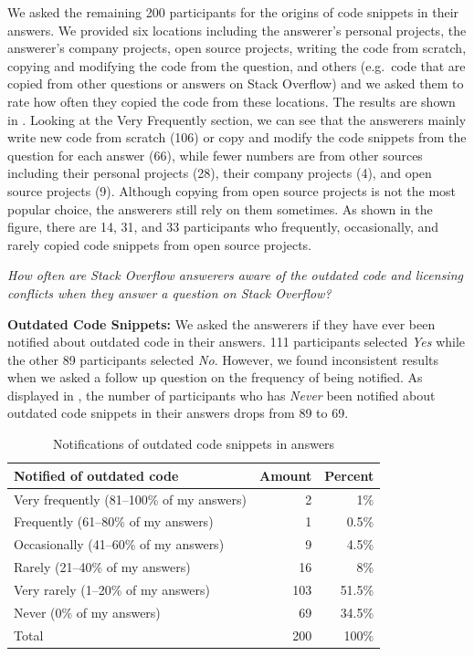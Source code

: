 \documentclass[10pt,journal,compsoc]{IEEEtran}
\begin{document}
We asked the remaining 200 participants for the origins of code snippets in
their answers. We provided six locations including the answerer's personal
projects, the answerer's company projects, open source projects, writing the
code from scratch, copying and modifying the code from the question, and others
(e.g.\ code that are copied from other questions or answers on Stack Overflow)
and we asked them to rate how often they copied the code from these locations. The
results are shown in . Looking at the Very
Frequently section, we can see that the answerers mainly write new code from
scratch (106) or copy and modify the code snippets from the question for each answer (66),
while fewer numbers are from other sources including their personal projects
(28), their company projects (4), and open source projects (9). Although
copying from open source projects is not the most popular choice, the answerers
still rely on them sometimes. As shown in the figure, there are 14, 31, and 33
participants who frequently, occasionally, and rarely copied code snippets from
open source projects.

\vspace{0.25cm}
\textit{How often are Stack Overflow
	answerers aware of the outdated code and 
	licensing conflicts when
	they answer a question on Stack Overflow?} 
\vspace{0.25cm}

\textbf{Outdated Code Snippets:} We asked the answerers if they have ever been notified about outdated code in
their answers. 111 participants selected \textit{Yes} while the other 89 participants
selected \textit{No}. However, we found inconsistent results when we asked a follow up
question on the frequency of being notified. As displayed in
, the number of participants who has
\textit{Never} been notified about outdated code snippets in their answers drops
from 89 to 69.

\begin{table}
	\centering
	\caption{Notifications of outdated code snippets in answers}
	\label{tab:survey_code_snippet_outdated}
	\begin{tabular}{lrr}
		\toprule
		Notified of outdated code & Amount & Percent \\
		\midrule
		Very frequently (81--100\% of my answers) & 2 & 1\% \\
		Frequently (61--80\% of my answers) & 1 & 0.5\% \\
		Occasionally (41--60\% of my answers) & 9 & 4.5\% \\
		Rarely (21--40\% of my answers) & 16 & 8\% \\
		Very rarely (1--20\% of my answers) & 103 & 51.5\% \\
		Never (0\% of my answers) & 69 & 34.5\% \\
		\midrule
		Total & 200 & 100\% \\
		\bottomrule
	\end{tabular}
\end{table}
\end{document}

